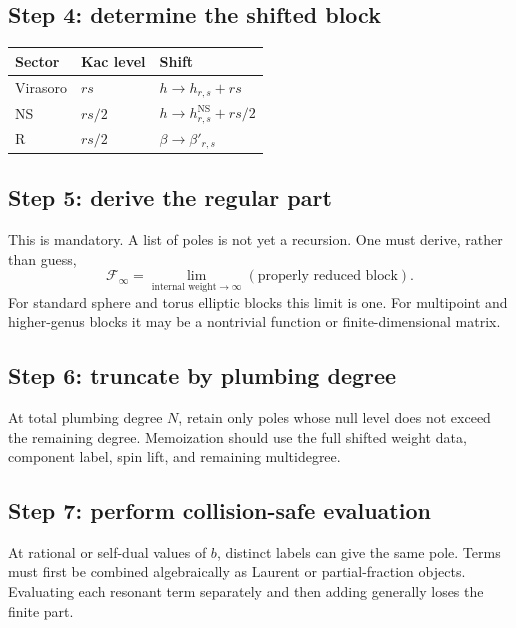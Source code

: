 \documentclass[11pt]{article}
\newcommand{\NS}{\mathrm{NS}}
\newcommand{\F}{\mathcal F}
\begin{document}
\subsection*{Step 4: determine the shifted block}
\begin{center}
\begin{tabular}{@{}lll@{}}
\toprule
Sector & Kac level & Shift\\
\midrule
Virasoro & \(rs\) & \(h\to h_{r,s}+rs\)\\
NS & \(rs/2\) & \(h\to h^\NS_{r,s}+rs/2\)\\
R & \(rs/2\) & \(\beta\to\beta'_{r,s}\)\\
\bottomrule
\end{tabular}
\end{center}

\subsection*{Step 5: derive the regular part}

This is mandatory.  A list of poles is not yet a recursion.  One must
derive, rather than guess,
\begin{equation}
 \F_{\infty}
 =
 \lim_{\text{internal weight}\to\infty}
 \left(\text{properly reduced block}\right).
 \label{eq:regular-part-requirement}
\end{equation}
For standard sphere and torus elliptic blocks this limit is one.  For
multipoint and higher-genus blocks it may be a nontrivial function or
finite-dimensional matrix.

\subsection*{Step 6: truncate by plumbing degree}

At total plumbing degree \(N\), retain only poles whose null level does not
exceed the remaining degree.  Memoization should use the full shifted
weight data, component label, spin lift, and remaining multidegree.

\subsection*{Step 7: perform collision-safe evaluation}

At rational or self-dual values of \(b\), distinct labels can give the same
pole.  Terms must first be combined algebraically as Laurent or
partial-fraction objects.  Evaluating each resonant term separately and
then adding generally loses the finite part.
\end{document}
